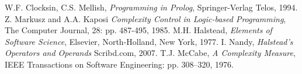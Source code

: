 \documentclass[11pt,a4paper,twoside]{article}
\begin{document}
\newpage

\begin{thebibliography}{halstead}
  W.F. Clocksin, C.S. Mellish, 
  \emph{Programming in Prolog}, 
  Springer-Verlag Telos, 1994.
  Z. Markusz and A.A. Kaposi 
  \emph{Complexity Control in Logic-based Programming},
  The Computer Journal, 28: pp. 487-495, 1985.
  M.H. Halstead, 
  \emph{Elements of Software Science}, 
  Elsevier, North-Holland, New York, 1977.
  I. Nandy, 
  \emph{Halstead's Operators and Operands}
  Scribd.com, 2007.
  T.J. McCabe, 
  \emph{A Complexity Measure}, 
  IEEE Transactions on Software Engineering: pp. 308–320, 1976.
\end{thebibliography}
\end{document}
